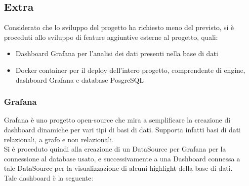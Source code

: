 	\subsection{Extra}
		Considerato che lo sviluppo del progetto ha richiesto meno del previsto, si è proceduti allo sviluppo di feature aggiuntive esterne al progetto, quali:
		\begin{itemize}
			\item Dashboard Grafana per l'analisi dei dati presenti nella base di dati
			\item Docker container per il deploy dell'intero progetto, comprendente di engine, dashboard Grafana e database PosgreSQL
		\end{itemize}
		\subsubsection{Grafana}
			Grafana è uno progetto open-source che mira a semplificare la creazione di dashboard dinamiche per vari tipi di basi di dati. Supporta infatti basi di dati relazionali, a grafo e non relazionali.\\
			Si è proceduto quindi alla creazione di un DataSource per Grafana per la connessione al database usato, e successivamente a una Dashboard connessa a tale DataSource per la visualizzazione di alcuni highlight della base di dati. \\
			Tale dashboard è la seguente:
			\newpage
